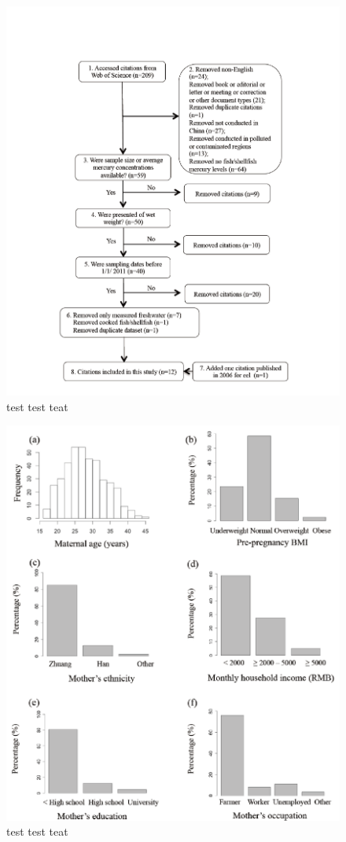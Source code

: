 \begin{figure}
  \centering
    \label{fig:Fig22}
  \includegraphics[scale=1]{Figures/Fig22.pdf}
  \caption[test caption]{test test teat}
\end{figure}

\begin{figure}
  \centering
    \label{fig:Fig23}
  \includegraphics[scale=1]{Figures/Fig23.pdf}
  \caption[test caption]{test test teat}
\end{figure}

